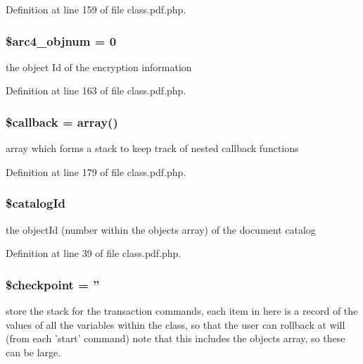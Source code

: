 \-Definition at line 159 of file class.\-pdf.\-php.

\hypertarget{class_cpdf_a7da30b74291ccb1aa4f0368140a36018}{
\subsubsection[{\$arc4\-\_\-objnum}]{\setlength{\rightskip}{0pt plus 5cm}\$arc4\-\_\-objnum = 0}}\label{class_cpdf_a7da30b74291ccb1aa4f0368140a36018}
the object \-Id of the encryption information 

\-Definition at line 163 of file class.\-pdf.\-php.

\hypertarget{class_cpdf_abc7c2ac0d93d22f71221e8b60512c860}{
\subsubsection[{\$callback}]{\setlength{\rightskip}{0pt plus 5cm}\$callback = array()}}\label{class_cpdf_abc7c2ac0d93d22f71221e8b60512c860}
array which forms a stack to keep track of nested callback functions 

\-Definition at line 179 of file class.\-pdf.\-php.

\hypertarget{class_cpdf_ab73b03ba4d8210e1551ba6b4277c4735}{
\subsubsection[{\$catalog\-Id}]{\setlength{\rightskip}{0pt plus 5cm}\$catalog\-Id}}\label{class_cpdf_ab73b03ba4d8210e1551ba6b4277c4735}
the object\-Id (number within the objects array) of the document catalog 

\-Definition at line 39 of file class.\-pdf.\-php.

\hypertarget{class_cpdf_aeb2b7ad87c29b9898f9f05782a5de508}{
\subsubsection[{\$checkpoint}]{\setlength{\rightskip}{0pt plus 5cm}\$checkpoint = ''}}\label{class_cpdf_aeb2b7ad87c29b9898f9f05782a5de508}
store the stack for the transaction commands, each item in here is a record of the values of all the variables within the class, so that the user can rollback at will (from each 'start' command) note that this includes the objects array, so these can be large. 


